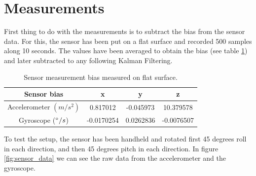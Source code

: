 \section{Measurements}

First thing to do with the measurements is to subtract the bias from the sensor data. For this, the sensor has been put on a flat surface and recorded 500 samples along 10 seconds. The values have been averaged to obtain the bias (see table \ref{tab:bias}) and later subtracted to any following Kalman Filtering.

\begin{table}[h]
    \centering
    \begin{tabular}{|c|c|c|c|}
    \hline
    Sensor bias & x & y & z\\ \hline
    Accelerometer $(m/s^2)$ & 0.817012 & -0.045973 & 10.379578 \\ \hline
    Gyroscope ($\degree/s$) & -0.0170254 &  0.0262836 & -0.0076507 \\
    \hline
\end{tabular}
    \caption{Sensor measurement bias measured on flat surface.}
    \label{tab:bias}
\end{table}

To test the setup, the sensor has been handheld and rotated first 45 degrees roll in each direction, and then 45 degrees pitch in each direction. In figure \ref{fig:sensor_data} we can see the raw data from the accelerometer and the gyroscope.

